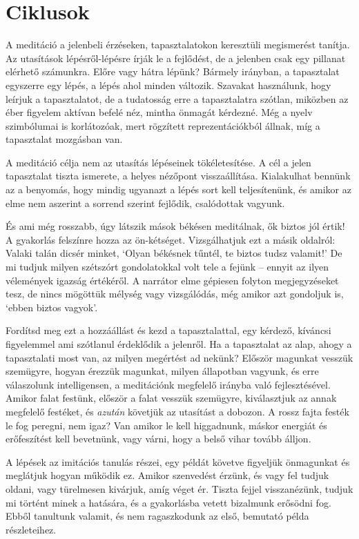 \chapter{Ciklusok}

A meditáció a jelenbeli érzéseken, tapasztalatokon keresztüli
megismerést tanítja. Az utasítások lépésről-lépésre írják le a
fejlődést, de a jelenben csak egy pillanat elérhető számunkra. Előre
vagy hátra lépünk? Bármely irányban, a tapasztalat egyszerre egy lépés,
a lépés ahol minden változik. Szavakat használunk, hogy leírjuk a
tapasztalatot, de a tudatosság erre a tapasztalatra szótlan, miközben az
éber figyelem aktívan befelé néz, mintha önmagát kérdezné. Még a nyelv
szimbólumai is korlátozóak, mert rögzített reprezentációkból állnak, míg
a tapasztalat mozgásban van.

A meditáció célja nem az utasítás lépéseinek tökéletesítése. A cél a
jelen tapasztalat tiszta ismerete, a helyes nézőpont visszaállítása.
Kialakulhat bennünk az a benyomás, hogy mindig ugyanazt a lépés sort
kell teljesítenünk, és amikor az elme nem aszerint a sorrend szerint
fejlődik, csalódottak vagyunk.

És ami még rosszabb, úgy látszik mások békésen meditálnak, ők biztos jól
értik! A gyakorlás felszínre hozza az ön-kétséget. Vizsgálhatjuk ezt a
másik oldalról: Valaki talán dicsér minket, `Olyan békésnek tűntél, te
biztos tudsz valamit!' De mi tudjuk milyen szétszórt gondolatokkal volt
tele a fejünk -- ennyit az ilyen vélemények igazság értékéről. A
narrátor elme gépiesen folyton megjegyzéseket tesz, de nincs mögöttük
mélység vagy vizsgálódás, még amikor azt gondoljuk is, `ebben biztos
vagyok'.

Fordítsd meg ezt a hozzáállást és kezd a tapasztalattal, egy kérdező,
kíváncsi figyelemmel ami szótlanul érdeklődik a jelenről. Ha a
tapasztalat az alap, ahogy a tapasztalati most van, az milyen megértést
ad nekünk? Először magunkat vesszük szemügyre, hogyan érezzük magunkat,
milyen állapotban vagyunk, és erre válaszolunk intelligensen, a
meditációnk megfelelő irányba való fejlesztésével. Amikor falat festünk,
először a falat vesszük szemügyre, kiválasztjuk az annak megfelelő
festéket, és \emph{azután} követjük az utasítást a dobozon. A rossz
fajta festék le fog peregni, nem igaz? Van amikor le kell higgadnunk,
máskor energiát és erőfeszítést kell bevetnünk, vagy várni, hogy a belső
vihar tovább álljon.

A lépések az imitációs tanulás részei, egy példát követve figyeljük
önmagunkat és meglátjuk hogyan működik ez. Amikor szenvedést érzünk, és
vagy fel tudjuk oldani, vagy türelmesen kivárjuk, amíg véget ér. Tiszta
fejjel visszanézünk, tudjuk mi történt minek a hatására, és a
gyakorlásba vetett bizalmunk erősödni fog. Ebből tanultunk valamit, és
nem ragaszkodunk az első, bemutató példa részleteihez.

